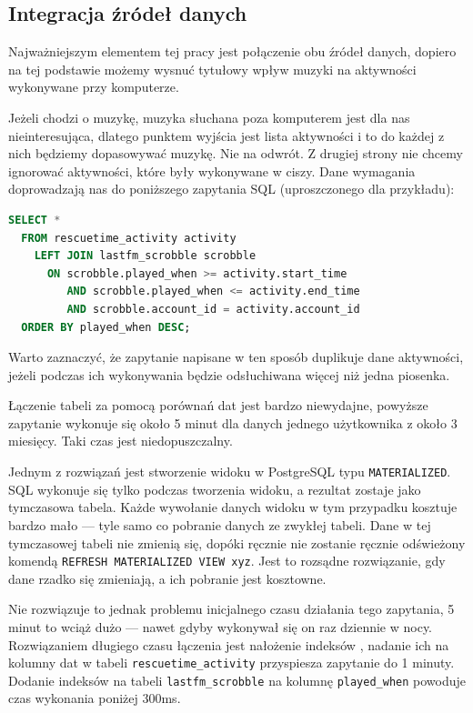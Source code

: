 \documentclass[brudnopis]{xmgr}
\begin{document}
        \subsection{Integracja źródeł danych}

            Najważniejszym elementem tej pracy jest połączenie obu źródeł danych,
            dopiero na tej podstawie możemy wysnuć tytułowy wpływ muzyki na aktywności wykonywane przy komputerze.

            Jeżeli chodzi o muzykę, muzyka słuchana poza komputerem jest dla nas nieinteresująca,
            dlatego punktem wyjścia jest lista aktywności i to do każdej z nich będziemy dopasowywać muzykę. Nie na odwrót.
            Z drugiej strony nie chcemy ignorować aktywności, które były wykonywane w ciszy.
            Dane wymagania doprowadzają nas do poniższego zapytania SQL (uproszczonego dla przykładu):

\begin{lstlisting}[language=sql]
SELECT *
  FROM rescuetime_activity activity
    LEFT JOIN lastfm_scrobble scrobble
      ON scrobble.played_when >= activity.start_time
         AND scrobble.played_when <= activity.end_time
         AND scrobble.account_id = activity.account_id
  ORDER BY played_when DESC;
\end{lstlisting}

            Warto zaznaczyć, że zapytanie napisane w ten sposób duplikuje dane aktywności,
            jeżeli podczas ich wykonywania będzie odsłuchiwana więcej niż jedna piosenka.

            Łączenie tabeli za pomocą porównań dat jest bardzo niewydajne,
            powyższe zapytanie wykonuje się około 5 minut dla danych jednego użytkownika z około 3 miesięcy.
            Taki czas jest niedopuszczalny.

            Jednym z rozwiązań jest stworzenie widoku w PostgreSQL typu \verb|MATERIALIZED|.
            SQL wykonuje się tylko podczas tworzenia widoku, a rezultat zostaje jako tymczasowa tabela.
            Każde wywołanie danych widoku w tym przypadku kosztuje bardzo mało --- tyle samo co pobranie danych ze zwykłej tabeli.
            Dane w tej tymczasowej tabeli nie zmienią się, dopóki ręcznie nie zostanie ręcznie odświeżony komendą
            \verb|REFRESH MATERIALIZED VIEW xyz|. Jest to rozsądne rozwiązanie, gdy dane rzadko się zmieniają, a ich pobranie jest kosztowne.

            Nie rozwiązuje to jednak problemu inicjalnego czasu działania tego zapytania,
            5 minut to wciąż dużo --- nawet gdyby wykonywał się on raz dziennie w nocy.
            Rozwiązaniem długiego czasu łączenia jest nałożenie indeksów \cite{postgresql:efficient-indexes},
            nadanie ich na kolumny dat w tabeli \verb|rescuetime_activity| przyspiesza zapytanie do 1 minuty.
            Dodanie indeksów na tabeli \verb|lastfm_scrobble| na kolumnę \verb|played_when| powoduje czas wykonania poniżej 300ms.
\end{document}
